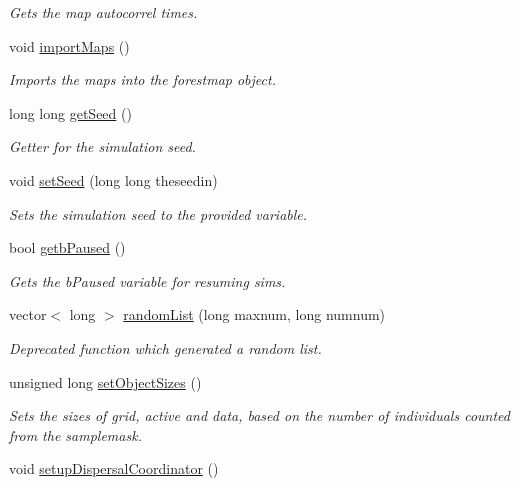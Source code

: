 \begin{DoxyCompactItemize}
\begin{DoxyCompactList}\small\item\em Gets the map autocorrel times. \end{DoxyCompactList}\item 
void \hyperlink{class_tree_a8e60e04be160c2d7de0ab1c834e6a95b}{import\+Maps} ()
\begin{DoxyCompactList}\small\item\em Imports the maps into the forestmap object. \end{DoxyCompactList}\item 
long long \hyperlink{class_tree_a857521315ca6bd9b3300d099488d74f1}{get\+Seed} ()
\begin{DoxyCompactList}\small\item\em Getter for the simulation seed. \end{DoxyCompactList}\item 
void \hyperlink{class_tree_a65f098693e08e33f039a8797ba57c3e0}{set\+Seed} (long long theseedin)
\begin{DoxyCompactList}\small\item\em Sets the simulation seed to the provided variable. \end{DoxyCompactList}\item 
bool \hyperlink{class_tree_a839ff291e97962d1aaed4d785f394a89}{getb\+Paused} ()
\begin{DoxyCompactList}\small\item\em Gets the b\+Paused variable for resuming sims. \end{DoxyCompactList}\item 
vector$<$ long $>$ \hyperlink{class_tree_a27bd274fe727892c84d153d9bd5ddbf0}{random\+List} (long maxnum, long numnum)
\begin{DoxyCompactList}\small\item\em Deprecated function which generated a random list. \end{DoxyCompactList}\item 
unsigned long \hyperlink{class_tree_a869ab0aba75336f737cbb137c74b8abc}{set\+Object\+Sizes} ()
\begin{DoxyCompactList}\small\item\em Sets the sizes of grid, active and data, based on the number of individuals counted from the samplemask. \end{DoxyCompactList}\item 
void \hyperlink{class_tree_ac31286aee0516ed9104aee4dde5a0651}{setup\+Dispersal\+Coordinator} ()\hypertarget{class_tree_ac31286aee0516ed9104aee4dde5a0651}{}\label{class_tree_ac31286aee0516ed9104aee4dde5a0651}


\end{DoxyCompactItemize}
